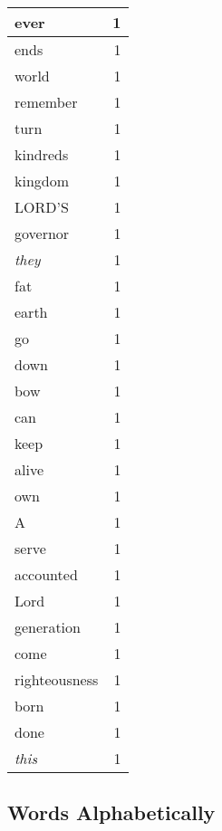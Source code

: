 \begin{center}
\begin{longtable}{l|r}
ever & 1 \\ \hline
ends & 1 \\ \hline
world & 1 \\ \hline
remember & 1 \\ \hline
turn & 1 \\ \hline
kindreds & 1 \\ \hline
kingdom & 1 \\ \hline
LORD'S & 1 \\ \hline
governor & 1 \\ \hline
\emph{they} & 1 \\ \hline
fat & 1 \\ \hline
earth & 1 \\ \hline
go & 1 \\ \hline
down & 1 \\ \hline
bow & 1 \\ \hline
can & 1 \\ \hline
keep & 1 \\ \hline
alive & 1 \\ \hline
own & 1 \\ \hline
A & 1 \\ \hline
serve & 1 \\ \hline
accounted & 1 \\ \hline
Lord & 1 \\ \hline
generation & 1 \\ \hline
come & 1 \\ \hline
righteousness & 1 \\ \hline
born & 1 \\ \hline
done & 1 \\ \hline
\emph{this} & 1 \\ \hline
\end{longtable}
\end{center}



\normalsize



\subsection{Words Alphabetically}

